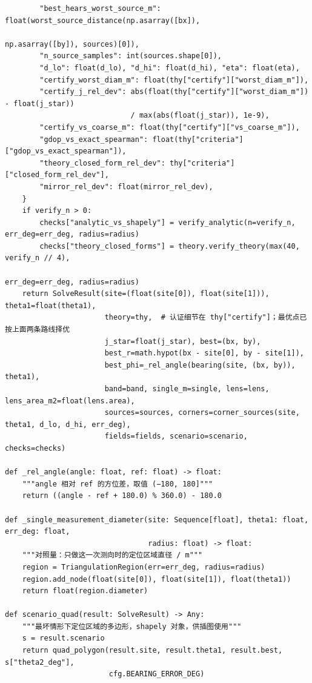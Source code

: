 \documentclass[UTF8, zihao=5,AutoFakeBold=2]{ctexart}
\begin{document}
\begin{lstlisting}
        "best_hears_worst_source_m": float(worst_source_distance(np.asarray([bx]),
                                                                 np.asarray([by]), sources)[0]),
        "n_source_samples": int(sources.shape[0]),
        "d_lo": float(d_lo), "d_hi": float(d_hi), "eta": float(eta),
        "certify_worst_diam_m": float(thy["certify"]["worst_diam_m"]),
        "certify_j_rel_dev": abs(float(thy["certify"]["worst_diam_m"]) - float(j_star))
                             / max(abs(float(j_star)), 1e-9),
        "certify_vs_coarse_m": float(thy["certify"]["vs_coarse_m"]),
        "gdop_vs_exact_spearman": float(thy["criteria"]["gdop_vs_exact_spearman"]),
        "theory_closed_form_rel_dev": thy["criteria"]["closed_form_rel_dev"],
        "mirror_rel_dev": float(mirror_rel_dev),
    }
    if verify_n > 0:
        checks["analytic_vs_shapely"] = verify_analytic(n=verify_n, err_deg=err_deg, radius=radius)
        checks["theory_closed_forms"] = theory.verify_theory(max(40, verify_n // 4),
                                                             err_deg=err_deg, radius=radius)
    return SolveResult(site=(float(site[0]), float(site[1])), theta1=float(theta1),
                       theory=thy,  # 认证细节在 thy["certify"]；最优点已按上面两条路线择优
                       j_star=float(j_star), best=(bx, by),
                       best_r=math.hypot(bx - site[0], by - site[1]),
                       best_phi=_rel_angle(bearing(site, (bx, by)), theta1),
                       band=band, single_m=single, lens=lens, lens_area_m2=float(lens.area),
                       sources=sources, corners=corner_sources(site, theta1, d_lo, d_hi, err_deg),
                       fields=fields, scenario=scenario, checks=checks)

def _rel_angle(angle: float, ref: float) -> float:
    """angle 相对 ref 的方位差，取值 (−180, 180]"""
    return ((angle - ref + 180.0) % 360.0) - 180.0

def _single_measurement_diameter(site: Sequence[float], theta1: float, err_deg: float,
                                 radius: float) -> float:
    """对照量：只做这一次测向时的定位区域直径 / m"""
    region = TriangulationRegion(err=err_deg, radius=radius)
    region.add_node(float(site[0]), float(site[1]), float(theta1))
    return float(region.diameter)

def scenario_quad(result: SolveResult) -> Any:
    """最坏情形下定位区域的多边形，shapely 对象，供插图使用"""
    s = result.scenario
    return quad_polygon(result.site, result.theta1, result.best, s["theta2_deg"],
                        cfg.BEARING_ERROR_DEG)
	\end{lstlisting}
\end{document}
